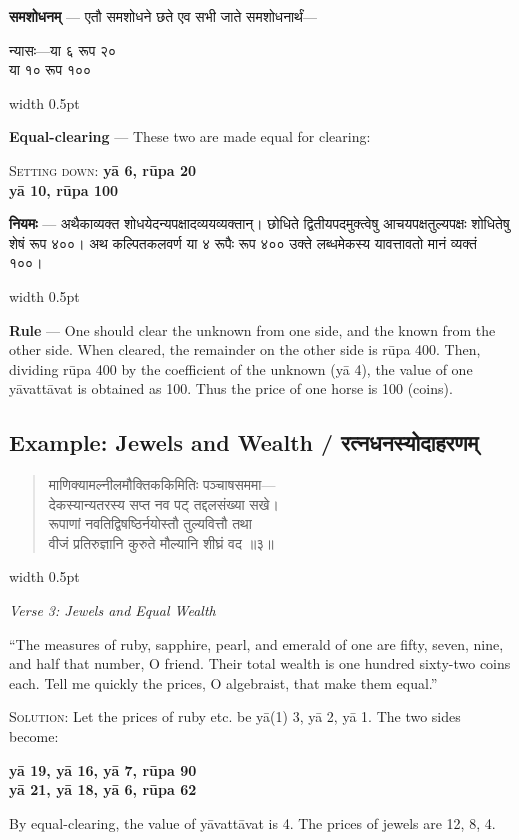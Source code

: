 \documentclass[11pt,a4paper]{article}
\newcommand{\dev}[1]{{\devanagarifont #1}}
\newcommand{\vs}{\vspace{0.5em}}
\newenvironment{sanskritverse}{%
  \begin{quote}\devanagarifont\textcolor{versecolor}%
}{%
  \end{quote}
}
\newcommand{\bilingual}[2]{%
  \par\vspace{0.5em}%
  \noindent\begin{minipage}[t]{0.47\textwidth}%
  \setlength{\parindent}{0pt}%
  \small #1%
  \end{minipage}%
  \hfill\textcolor{columnrule}{\vrule width 0.5pt}\hfill%
  \begin{minipage}[t]{0.47\textwidth}%
  \setlength{\parindent}{0pt}%
  \small\raggedright #2%
  \end{minipage}%
  \par\vspace{0.5em}%
}
\begin{document}
\vs

\bilingual{\textbf{समशोधनम्} — एतौ समशोधने छते एव सभी जाते समशोधनार्थं—
\begin{center}\dev{न्यासः---या ६ रूप २०}\\\dev{या १० रूप १००}\end{center}
}{%
\textbf{Equal-clearing} --- These two are made equal for clearing:
\begin{center}\textsc{Setting down:} \textbf{y\={a} 6, r\={u}pa 20}\\\textbf{y\={a} 10, r\={u}pa 100}\end{center}}

\vs

\bilingual{\textbf{नियमः} — अथैकाव्यक्त शोधयेदन्यपक्षादव्ययव्यक्तान्। छोधिते द्वितीयपदमुक्त्वेषु आचयपक्षतुल्यपक्षः शोधितेषु शेषं रूप ४००। अथ कल्पितकलवर्ण \dev{या ४} रूपैः रूप ४०० उक्ते लब्धमेकस्य यावत्तावतो मानं व्यक्तं १००।
}{%
\textbf{Rule} --- One should clear the unknown from one side, and the known from the other side. When cleared, the remainder on the other side is r\={u}pa 400. Then, dividing r\={u}pa 400 by the coefficient of the unknown (y\={a} 4), the value of one y\={a}vatt\={a}vat is obtained as 100. Thus the price of one horse is 100 (coins).}

\newpage

\subsection*{Example: Jewels and Wealth / रत्नधनस्योदाहरणम्}

\bilingual{\begin{sanskritverse}
माणिक्यामल्नीलमौक्तिककिमितिः पञ्चाषसममा—\\
देकस्यान्यतरस्य सप्त नव पट् तद्दलसंख्या सखे।\\
रूपाणां नवतिद्विषष्ठिर्नयोस्तौ तुल्यवित्तौ तथा\\
वीजं प्रतिरुज्ञानि कुरुते मौल्यानि शीघ्रं वद ॥३॥
\end{sanskritverse}
}{%
\begin{flushright}
\textit{Verse 3: Jewels and Equal Wealth}
\end{flushright}
``The measures of ruby, sapphire, pearl, and emerald of one are fifty, seven, nine, and half that number, O friend. Their total wealth is one hundred sixty-two coins each. Tell me quickly the prices, O algebraist, that make them equal.''

\vs
\textsc{Solution:} Let the prices of ruby etc. be y\={a}(1) 3, y\={a} 2, y\={a} 1. The two sides become:
\begin{center}\textbf{y\={a} 19, y\={a} 16, y\={a} 7, r\={u}pa 90}\\\textbf{y\={a} 21, y\={a} 18, y\={a} 6, r\={u}pa 62}\end{center}
By equal-clearing, the value of y\={a}vatt\={a}vat is 4. The prices of jewels are 12, 8, 4.}
\end{document}

